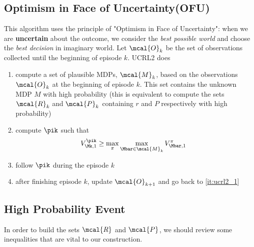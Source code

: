         \subsection{Optimism in Face of Uncertainty(OFU)}
        \label{subsec:OFU}
        
        This algorithm uses the principle of "Optimism in Face of Uncertainty": when we are \textbf{uncertain} about the outcome, we consider the \textit{best possible world} and choose the \textit{best decision} in imaginary world. Let $\mcal{O}_k$ be the set of observations collected until the beginning of episode $k$. UCRL2 does
            \begin{enumerate}
                \item \label{it:ucrl2_1} compute a set of plausible MDPs, $\mcal{M}_k$, based on the observations $\mcal{O}_k$ at the beginning of episode $k$. This set contains the unknown MDP $M$ with high probability (this is equivalent to compute the sets $\mcal{R}_k$ and $\mcal{P}_k$ containing $r$ and $P$ respectively with high probability)
                \item compute $\pik$ such that
                    \begin{align}
                        V_{\Mk,1}^{\pik} \ge \max_{\pi}\max_{\Mbar\in\mcal{M}_k} V_{\Mbar,1}^\pi
                    \end{align}
                \item follow $\pik$ during the episode $k$
                \item after finishing episode $k$, update $\mcal{O}_{k+1}$ and go back to \ref{it:ucrl2_1}
            \end{enumerate}
        
        \subsection{High Probability Event}
        \label{subsec:high_prob_event}
            In order to build the sets $\mcal{R}$ and $\mcal{P}$, we should review some inequalities that are vital to our construction.
        
